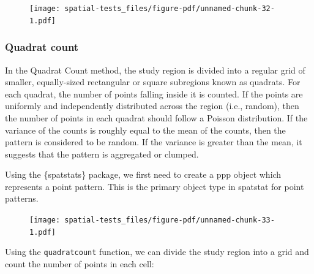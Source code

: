 \documentclass[
  letterpaper,
]{book}
\newenvironment{Shaded}{\begin{snugshade}}{\end{snugshade}}
\newcommand{\CommentTok}[1]{\textcolor[rgb]{0.37,0.37,0.37}{#1}}
\newcommand{\DocumentationTok}[1]{\textcolor[rgb]{0.37,0.37,0.37}{\textit{#1}}}
\newcommand{\FunctionTok}[1]{\textcolor[rgb]{0.28,0.35,0.67}{#1}}
\newcommand{\NormalTok}[1]{\textcolor[rgb]{0.00,0.23,0.31}{#1}}
\newcommand{\OtherTok}[1]{\textcolor[rgb]{0.00,0.23,0.31}{#1}}
\newcommand{\SpecialCharTok}[1]{\textcolor[rgb]{0.37,0.37,0.37}{#1}}
\begin{document}
\begin{figure}[H]

\texttt{[image: spatial-tests\_files/figure-pdf/unnamed-chunk-32-1.pdf]} \hfill{}

\end{figure}

\hypertarget{quadrat-count}{%
\subsubsection{Quadrat count}\label{quadrat-count}}

In the Quadrat Count method, the study region is divided into a regular
grid of smaller, equally-sized rectangular or square subregions known as
quadrats. For each quadrat, the number of points falling inside it is
counted. If the points are uniformly and independently distributed
across the region (i.e., random), then the number of points in each
quadrat should follow a Poisson distribution. If the variance of the
counts is roughly equal to the mean of the counts, then the pattern is
considered to be random. If the variance is greater than the mean, it
suggests that the pattern is aggregated or clumped.

Using the \{spatstats\} package, we first need to create a ppp object
which represents a point pattern. This is the primary object type in
spatstat for point patterns.

\begin{Shaded}
\end{Shaded}

\begin{figure}[H]

\texttt{[image: spatial-tests\_files/figure-pdf/unnamed-chunk-33-1.pdf]} \hfill{}

\end{figure}

Using the \texttt{quadratcount} function, we can divide the study region
into a grid and count the number of points in each cell:
\end{document}
